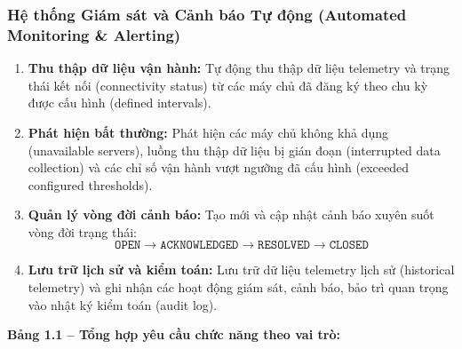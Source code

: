 \subsubsection{Hệ thống Giám sát và Cảnh báo Tự động (Automated Monitoring \& Alerting)}
\begin{enumerate}[label=\textbf{FS-\arabic*}., leftmargin=2.5em]
    \item \textbf{Thu thập dữ liệu vận hành:} Tự động thu thập dữ liệu telemetry và trạng thái kết nối (connectivity status) từ các máy chủ đã đăng ký theo chu kỳ được cấu hình (defined intervals).
    \item \textbf{Phát hiện bất thường:} Phát hiện các máy chủ không khả dụng (unavailable servers), luồng thu thập dữ liệu bị gián đoạn (interrupted data collection) và các chỉ số vận hành vượt ngưỡng đã cấu hình (exceeded configured thresholds).
    \item \textbf{Quản lý vòng đời cảnh báo:} Tạo mới và cập nhật cảnh báo xuyên suốt vòng đời trạng thái:
    \begin{equation*}
    \texttt{OPEN} \longrightarrow \texttt{ACKNOWLEDGED} \longrightarrow \texttt{RESOLVED} \longrightarrow \texttt{CLOSED}
    \end{equation*}
    \item \textbf{Lưu trữ lịch sử và kiểm toán:} Lưu trữ dữ liệu telemetry lịch sử (historical telemetry) và ghi nhận các hoạt động giám sát, cảnh báo, bảo trì quan trọng vào nhật ký kiểm toán (audit log).
\end{enumerate}

\vspace{0.5em}
\noindent\textbf{Bảng 1.1 -- Tổng hợp yêu cầu chức năng theo vai trò:}

